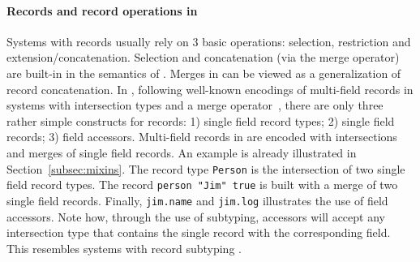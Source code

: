 \paragraph{Records and record operations in \name}
Systems with records usually rely on 3 basic operations: selection,
restriction and extension/concatenation.  Selection and concatenation
(via the merge operator) are built-in in the semantics of
\name. Merges in \name can be viewed as a generalization of record
concatenation.  In \name, following well-known encodings of
multi-field records in
systems with intersection types and a merge
operator~\cite{reynolds1997design,reynolds1991coherence}, there are only three rather simple constructs
for records: 1) single field record types; 2) single field records; 3)
field accessors. Multi-field records in \name are encoded with
intersections and merges of single field records. An example is
already illustrated in Section~\ref{subsec:mixins}.  The record type
\lstinline$Person$ is the intersection of two single field record
types. The record \lstinline$person "Jim" true$ is built with a merge
of two single field records. Finally, \lstinline{jim.name} and
\lstinline{jim.log} illustrates the use of field accessors.  Note how,
through the use of subtyping, accessors will accept any intersection
type that contains the single record with the corresponding field.
This resembles systems with record subtyping
\cite{cardelli1990operations,pierce1994simple}.


